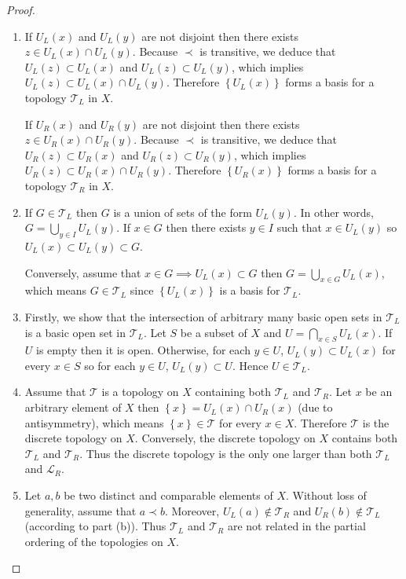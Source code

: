\begin{proof}
	\begin{enumerate}[label={(\alph*)}]
		\item If \( U_{L}(x) \) and \( U_{L}(y) \) are not disjoint then there exists \( z \in U_{L}(x) \cap U_{L}(y) \). Because \( \prec \) is transitive, we deduce that \( U_{L}(z) \subset U_{L}(x) \) and \( U_{L}(z) \subset U_{L}(y) \), which implies \( U_{L}(z) \subset U_{L}(x) \cap U_{L}(y) \). Therefore \( \left\{ U_{L}(x) \right\} \) forms a basis for a topology \( \mathscr{T}_{L} \) in \( X \).

		      If \( U_{R}(x) \) and \( U_{R}(y) \) are not disjoint then there exists \( z \in U_{R}(x) \cap U_{R}(y) \). Because \( \prec \) is transitive, we deduce that \( U_{R}(z) \subset U_{R}(x) \) and \( U_{R}(z) \subset U_{R}(y) \), which implies \( U_{R}(z) \subset U_{R}(x) \cap U_{R}(y) \). Therefore \( \left\{ U_{R}(x) \right\} \) forms a basis for a topology \( \mathscr{T}_{R} \) in \( X \).
		\item If \( G \in \mathscr{T}_{L} \) then \( G \) is a union of sets of the form \( U_{L}(y) \). In other words, \( G = \bigcup_{y \in I} U_{L}(y) \). If \( x \in G \) then there exists \( y \in I \) such that \( x \in U_{L}(y) \) so \( U_{L}(x) \subset U_{L}(y) \subset G \).

		      Conversely, assume that \( x \in G \implies U_{L}(x) \subset G \) then \( G = \bigcup_{x\in G} U_{L}(x) \), which means \( G \in \mathscr{T}_{L} \) since \( \left\{ U_{L}(x) \right\} \) is a basis for \( \mathscr{T}_{L} \).
		\item Firstly, we show that the intersection of arbitrary many basic open sets in \( \mathscr{T}_{L} \) is a basic open set in \( \mathscr{T}_{L} \). Let \( S \) be a subset of \( X \) and \( U = \bigcap_{x\in S} U_{L}(x) \). If \( U \) is empty then it is open. Otherwise, for each \( y \in U \), \( U_{L}(y) \subset U_{L}(x) \) for every \( x \in S \) so for each \( y \in U \), \( U_{L}(y) \subset U \). Hence \( U \in \mathscr{T}_{L} \).
		\item Assume that \( \mathscr{T} \) is a topology on \( X \) containing both \( \mathscr{T}_{L} \) and \( \mathscr{T}_{R} \). Let \( x \) be an arbitrary element of \( X \) then \( \left\{ x \right\} = U_{L}(x) \cap U_{R}(x) \) (due to antisymmetry), which means \( \left\{ x \right\} \in \mathscr{T} \) for every \( x \in X \). Therefore \( \mathscr{T} \) is the discrete topology on \( X \). Conversely, the discrete topology on \( X \) contains both \( \mathscr{T}_{L} \) and \( \mathscr{T}_{R} \). Thus the discrete topology is the only one larger than both \( \mathscr{T}_{L} \) and \( \mathscr{L}_{R} \).
		\item Let \( a, b \) be two distinct and comparable elements of \( X \). Without loss of generality, assume that \( a \prec b \). Moreover, \( U_{L}(a) \notin \mathscr{T}_{R} \) and \( U_{R}(b) \notin \mathscr{T}_{L} \) (according to part (b)). Thus \(\mathscr{T}_{L}\) and \(\mathscr{T}_{R}\) are not related in the partial ordering of the topologies on \(X\).
	\end{enumerate}
\end{proof}

